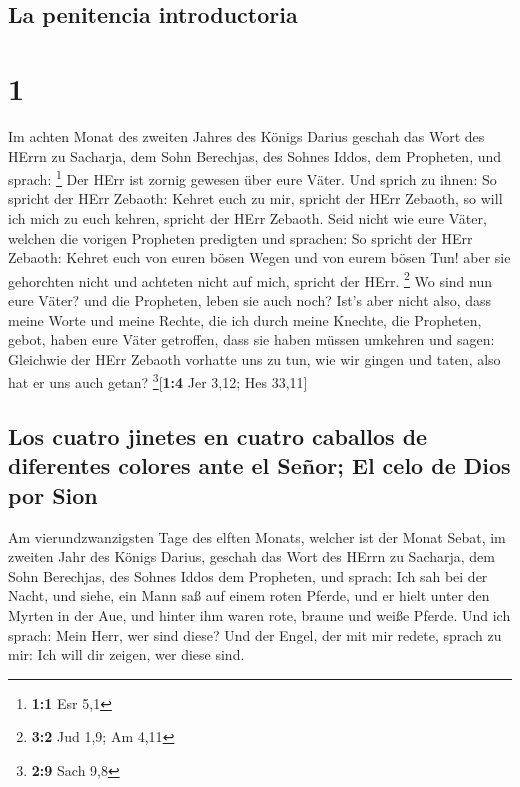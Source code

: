 \hypertarget{la-penitencia-introductoria}{%
\subsection{La penitencia
introductoria}\label{la-penitencia-introductoria}}

\hypertarget{section}{%
\section{1}\label{section}}

 Im achten Monat des zweiten Jahres des Königs Darius
geschah das Wort des HErrn zu Sacharja, dem Sohn Berechjas, des Sohnes
Iddos, dem Propheten, und sprach: \footnote{\textbf{1:1} Esr 5,1}
 Der HErr ist zornig gewesen über eure Väter.
 Und sprich zu ihnen: So spricht der HErr Zebaoth: Kehret
euch zu mir, spricht der HErr Zebaoth, so will ich mich zu euch kehren,
spricht der HErr Zebaoth.  Seid nicht wie eure Väter,
welchen die vorigen Propheten predigten und sprachen: So spricht der
HErr Zebaoth: Kehret euch von euren bösen Wegen und von eurem bösen Tun!
aber sie gehorchten nicht und achteten nicht auf mich, spricht der HErr.
\footnote{\textbf{3:2} Jud 1,9; Am 4,11}  Wo sind nun eure
Väter? und die Propheten, leben sie auch noch?  Ist's aber
nicht also, dass meine Worte und meine Rechte, die ich durch meine
Knechte, die Propheten, gebot, haben eure Väter getroffen, dass sie
haben müssen umkehren und sagen: Gleichwie der HErr Zebaoth vorhatte uns
zu tun, wie wir gingen und taten, also hat er uns auch getan?
\footnote{\textbf{2:9} Sach 9,8}{[}\textbf{1:4} Jer 3,12; Hes 33,11{]}

\hypertarget{los-cuatro-jinetes-en-cuatro-caballos-de-diferentes-colores-ante-el-seuxf1or-el-celo-de-dios-por-sion}{%
\subsection{Los cuatro jinetes en cuatro caballos de diferentes colores
ante el Señor; El celo de Dios por
Sion}\label{los-cuatro-jinetes-en-cuatro-caballos-de-diferentes-colores-ante-el-seuxf1or-el-celo-de-dios-por-sion}}

 Am vierundzwanzigsten Tage des elften Monats, welcher ist
der Monat Sebat, im zweiten Jahr des Königs Darius, geschah das Wort des
HErrn zu Sacharja, dem Sohn Berechjas, des Sohnes Iddos dem Propheten,
und sprach:  Ich sah bei der Nacht, und siehe, ein Mann
saß auf einem roten Pferde, und er hielt unter den Myrten in der Aue,
und hinter ihm waren rote, braune und weiße Pferde.  Und
ich sprach: Mein Herr, wer sind diese? Und der Engel, der mit mir
redete, sprach zu mir: Ich will dir zeigen, wer diese sind.

